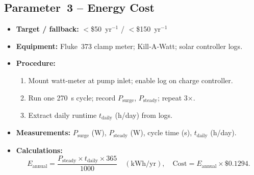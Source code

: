 \documentclass[12pt]{report}
\begin{document}
\subsection{Parameter 3 – Energy Cost}
\begin{itemize}[leftmargin=*]
  \item \textbf{Target / fallback:} $<$\$50 yr$^{-1}$ / $<$\$150 yr$^{-1}$
  \item \textbf{Equipment:} Fluke 373 clamp meter; Kill‑A‑Watt; solar controller logs.
  \item \textbf{Procedure:}
    \begin{enumerate}[label=\arabic*., leftmargin=*]
      \item Mount watt‐meter at pump inlet; enable log on charge controller.
      \item Run one 270 s cycle; record $P_{\mathrm{surge}}$, $P_{\mathrm{steady}}$; repeat 3×.
      \item Extract daily runtime $t_{\mathrm{daily}}$ (h/day) from logs.
    \end{enumerate}
  \item \textbf{Measurements:} $P_{\mathrm{surge}}$ (W), $P_{\mathrm{steady}}$ (W), cycle time (s), $t_{\mathrm{daily}}$ (h/day).
  \item \textbf{Calculations:}
    \[
      E_{\mathrm{annual}}
        = \frac{P_{\mathrm{steady}}\times t_{\mathrm{daily}}\times365}{1000}
        \quad(\mathrm{kWh/yr}),
      \quad
      \text{Cost}
        = E_{\mathrm{annual}}\times\$0.1294.
    \]
\end{itemize}
\end{document}
